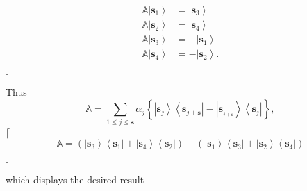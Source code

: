 \documentclass[aps,preprint]{revtex4}%
\begin{document}
\begin{align}
\mathbb{A}\left\vert \mathbf{s}_{1}\right\rangle  &  =\left\vert
\mathbf{s}_{3}\right\rangle \nonumber\\
\mathbb{A}\left\vert \mathbf{s}_{2}\right\rangle  &  =\left\vert
\mathbf{s}_{4}\right\rangle \\
\mathbb{A}\left\vert \mathbf{s}_{3}\right\rangle  &  =-\left\vert
\mathbf{s}_{1}\right\rangle \\
\mathbb{A}\left\vert \mathbf{s}_{4}\right\rangle  &  =-\left\vert
\mathbf{s}_{2}\right\rangle .
\end{align}
$\rfloor$

Thus
\begin{equation}
\mathbb{A=}\sum_{1\leq j\leq\mathbf{s}}\alpha_{j}\left\{  \left\vert
\mathbf{s}_{j}\right\rangle \left\langle \mathbf{s}_{j+\mathbf{s}}\right\vert
-\left\vert \mathbf{s}_{_{j+\mathbf{s}}}\right\rangle \left\langle
\mathbf{s}_{j}\right\vert \right\}  ,
\end{equation}
$\lceil$%
\begin{equation}
\mathbb{A}=\left(  \left\vert \mathbf{s}_{3}\right\rangle \left\langle
\mathbf{s}_{1}\right\vert +\left\vert \mathbf{s}_{4}\right\rangle \left\langle
\mathbf{s}_{2}\right\vert \right)  -\left(  \left\vert \mathbf{s}%
_{1}\right\rangle \left\langle \mathbf{s}_{3}\right\vert +\left\vert
\mathbf{s}_{2}\right\rangle \left\langle \mathbf{s}_{4}\right\vert \right)
\end{equation}
$\rfloor$

which displays the desired result%
\end{document}
